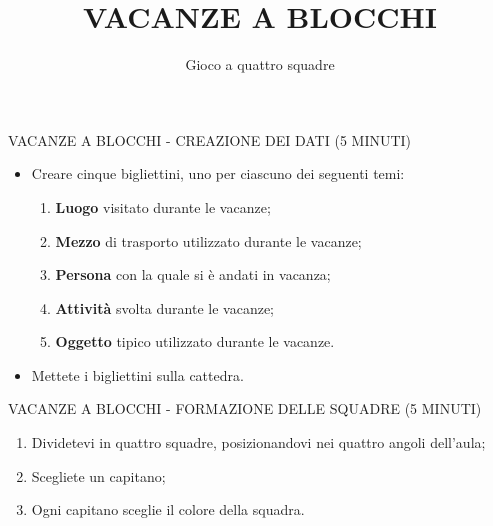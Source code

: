 \documentclass[aspectratio=1610]{beamer}
\title{VACANZE A BLOCCHI}
\subtitle{Gioco a quattro squadre}
\date{}
\institute{}
\begin{document}
\begin{frame}
    \titlepage
\end{frame}

\begin{frame}{VACANZE A BLOCCHI - CREAZIONE DEI DATI (5 MINUTI) }
    \begin{itemize}
        \item Creare cinque bigliettini, uno per ciascuno dei seguenti temi:
              \begin{enumerate}
                  \item \textbf{Luogo} visitato durante le vacanze;
                  \item \textbf{Mezzo} di trasporto utilizzato durante le vacanze;
                  \item \textbf{Persona} con la quale si è andati in vacanza;
                  \item \textbf{Attività} svolta durante le vacanze;
                  \item \textbf{Oggetto} tipico utilizzato durante le vacanze.
              \end{enumerate}
        \pause
        \item Mettete i bigliettini sulla cattedra.
    \end{itemize}
\end{frame}

\begin{frame}{VACANZE A BLOCCHI - FORMAZIONE DELLE SQUADRE (5 MINUTI)}
    \begin{enumerate}
        \item Dividetevi in quattro squadre, posizionandovi nei quattro angoli dell'aula;
        \pause
        \item Scegliete un capitano;
        \pause
        \item Ogni capitano sceglie il colore della squadra.
    \end{enumerate}
\end{frame}
\end{document}
